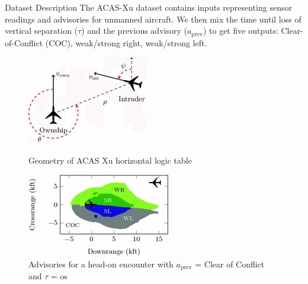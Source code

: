 \documentclass[9pt]{beamer}
\begin{document}
\begin{frame}{Dataset Description}
  The ACAS-Xu dataset contains inputs representing sensor readings and advisories for unmanned aircraft. We then mix the time until loss of vertical separation (\(\tau\)) and the previous advisory (\(a_{\text{prev}}\)) to get five outputs: Clear-of-Conflict (COC), weak/strong right, weak/strong left.
  \begin{figure}[ht]
    \centering
    \begin{minipage}[b]{0.45\linewidth}
        \includegraphics[width=\linewidth]{Figures/acasxu_geometry.jpg}
        \caption{Geometry of ACAS Xu horizontal logic table \cite{katz2017reluplex}}
        \label{fig:acasxu-geometry}
    \end{minipage}
    \hfill
    \begin{minipage}[b]{0.45\linewidth}
        \includegraphics[width=\linewidth]{Figures/acasxu_advisories.jpg}
        \caption{Advisories for a head-on encounter with \(a_{\text{prev}}\) = Clear of Conflict and \(\tau\) = os \cite{katz2017reluplex}}
        \label{fig:acasxu-advisories}
    \end{minipage}
\end{figure}
\end{frame}
\end{document}
